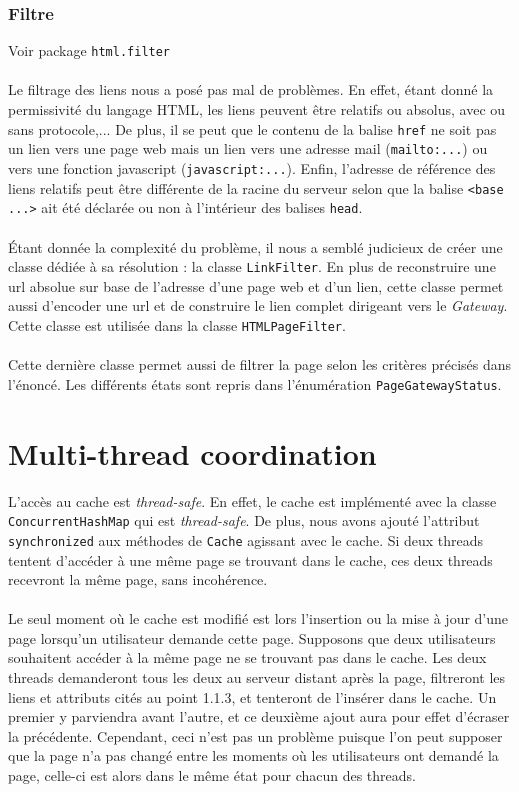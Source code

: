\documentclass[a4paper,11pt]{article}
\newcommand{\ttseek}[1]{Voir package \texttt{#1}\paragraph{}}
\begin{document}
\subsubsection{Filtre}
\ttseek{html.filter}
Le filtrage des liens nous a posé pas mal de problèmes. En effet, étant donné la permissivité du langage HTML, les liens peuvent être relatifs ou absolus, avec ou sans protocole,... De plus, il se peut que le contenu de la balise \texttt{href} ne soit pas un lien vers une page web mais un lien vers une adresse mail (\texttt{mailto:...}) ou vers une fonction javascript (\texttt{javascript:...}). Enfin, l'adresse de référence des liens relatifs peut être différente de la racine du serveur selon que la balise \texttt{<base ...>} ait été déclarée ou non à l'intérieur des balises \texttt{head}. 
\paragraph{}
Étant donnée la complexité du problème, il nous a semblé judicieux de créer une classe dédiée à sa résolution : la classe \texttt{LinkFilter}. En plus de reconstruire une url absolue sur base de l'adresse d'une page web et d'un lien, cette classe permet aussi d'encoder une url et de construire le lien complet dirigeant vers le \textit{Gateway}. Cette classe est utilisée dans la classe \texttt{HTMLPageFilter}.
\paragraph{}
Cette dernière classe permet aussi de filtrer la page selon les critères précisés dans l'énoncé. Les différents états sont repris dans l'énumération \texttt{PageGatewayStatus}.

\section{Multi-thread coordination}
L'accès au cache est \textit{thread-safe}. En effet, le cache est implémenté avec la classe \texttt{ConcurrentHashMap} qui est \textit{thread-safe}. De plus, nous avons ajouté l'attribut \texttt{synchronized} aux méthodes de \texttt{Cache} agissant avec le cache. Si deux threads tentent d'accéder à une même page se trouvant dans le cache, ces deux threads recevront la même page, sans incohérence.
\paragraph{}
Le seul moment où le cache est modifié est lors l'insertion ou la mise à jour d'une page lorsqu'un utilisateur demande cette page. Supposons que deux utilisateurs souhaitent accéder à la même page ne se trouvant pas dans le cache. Les deux threads demanderont tous les deux au serveur distant après la page, filtreront les liens et attributs cités au point 1.1.3, et tenteront de l'insérer dans le cache. Un premier y parviendra avant l'autre, et ce deuxième ajout aura pour effet d'écraser la précédente. Cependant, ceci n'est pas un problème puisque l'on peut supposer que la page n'a pas changé entre les moments où les utilisateurs ont demandé la page, celle-ci est alors dans le même état pour chacun des threads.
\end{document}
